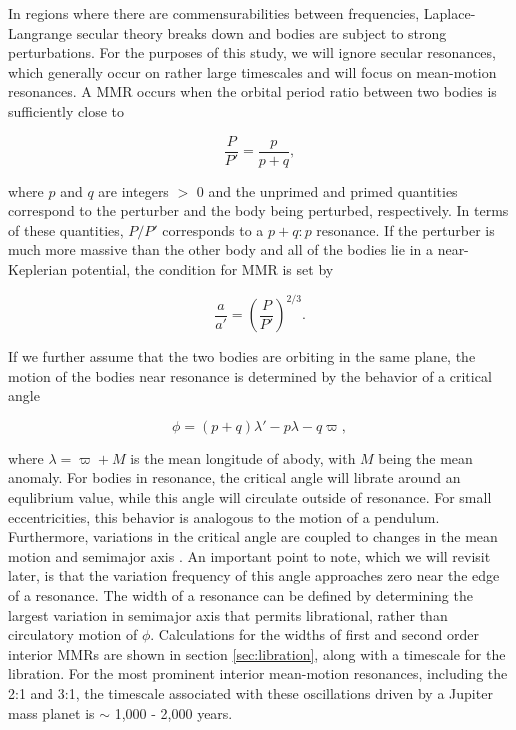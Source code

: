 In regions where there are commensurabilities between frequencies, Laplace-Langrange secular theory breaks down and bodies 
are subject to strong perturbations. For the purposes of this study, we will ignore secular resonances, which generally occur on 
rather large timescales and will focus on mean-motion resonances. A MMR occurs  when the orbital period ratio between two 
bodies is sufficiently close to

\begin{equation}\label{eq:per_mmr}
	\frac{P}{P'} = \frac{p}{p + q},
\end{equation}

\noindent where  $p$ and $q$ are integers $>$ 0 and the unprimed and primed quantities correspond to the perturber and the 
body being perturbed, respectively. In terms of these quantities, $P/P'$ corresponds to a $p+q:p$ resonance. If the perturber is 
much more massive than the other body and all of the bodies lie in a near-Keplerian potential, the condition for MMR is set by

\begin{equation}\label{eq:a_mmr}
	\frac{a}{a'} = \left( \frac{P}{P'} \right)^{2/3}.
\end{equation}

If we further assume that the two bodies are orbiting in the same plane, the motion of the bodies near resonance is determined 
by the behavior of a critical angle

\begin{equation}\label{eq:phi_crit}
	\phi = (p + q) \lambda' - p \lambda - q \varpi,
\end{equation}

\noindent where $\lambda = \varpi + M$ is the mean longitude of abody, with $M$ being the mean anomaly. For bodies in 
resonance, the critical angle will librate around an equlibrium value, while this angle will circulate outside of resonance. For small 
eccentricities, this behavior is analogous to the motion of a pendulum. Furthermore, variations in the critical angle are coupled to 
changes in the mean motion and semimajor axis \cite{murray99}. An important point to note, which we will revisit later, is that the 
variation frequency of this angle approaches zero near the edge of a resonance. The width of a resonance can be defined by 
determining the largest variation in semimajor axis that permits librational, rather than circulatory motion of $\phi$. Calculations 
for the widths of first and second order interior MMRs are shown in section \ref{sec:libration}, along with a timescale for the 
libration. For the most prominent interior mean-motion resonances, including the 2:1 and 3:1, the timescale associated with 
these oscillations driven by a Jupiter mass planet is  $\sim$ 1,000 - 2,000 years.

